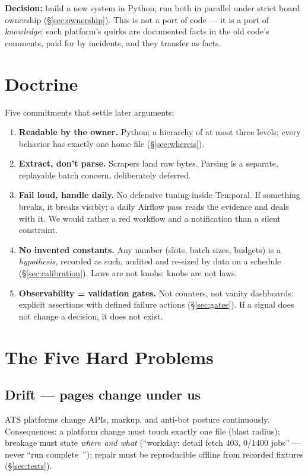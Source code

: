 \documentclass[11pt,a4paper]{article}
\begin{document}
\textbf{Decision:} build a new system in Python; run both in parallel under strict board ownership
(\S\ref{sec:ownership}). This is not a port of code --- it is a port of \emph{knowledge}: each platform's
quirks are documented facts in the old code's comments, paid for by incidents, and they transfer as facts.

\section{Doctrine}
\label{sec:doctrine}

Five commitments that settle later arguments:

\begin{enumerate}
\item \textbf{Readable by the owner.} Python; a hierarchy of at most three levels; every behavior has
exactly one home file (\S\ref{sec:whereis}).
\item \textbf{Extract, don't parse.} Scrapers land raw bytes. Parsing is a separate, replayable batch
concern, deliberately deferred.
\item \textbf{Fail loud, handle daily.} No defensive tuning inside Temporal. If something breaks, it breaks
visibly; a daily Airflow pass reads the evidence and deals with it. We would rather a red workflow and a
notification than a silent constraint.
\item \textbf{No invented constants.} Any number (slots, batch sizes, budgets) is a \emph{hypothesis},
recorded as such, audited and re-sized by data on a schedule (\S\ref{sec:calibration}). Laws are not knobs;
knobs are not laws.
\item \textbf{Observability = validation gates.} Not counters, not vanity dashboards: explicit assertions
with defined failure actions (\S\ref{sec:gates}). If a signal does not change a decision, it does not exist.
\end{enumerate}

\section{The Five Hard Problems}

\subsection{Drift --- pages change under us}
\label{sec:drift}
ATS platforms change APIs, markup, and anti-bot posture continuously. Consequences: a platform change must
touch exactly one file (blast radius); breakage must state \emph{where and what} (``workday: detail fetch
403, 0/1400 jobs'' --- never ``run complete~\checkmark''); repair must be reproducible offline from recorded
fixtures (\S\ref{sec:tests}).
\end{document}
